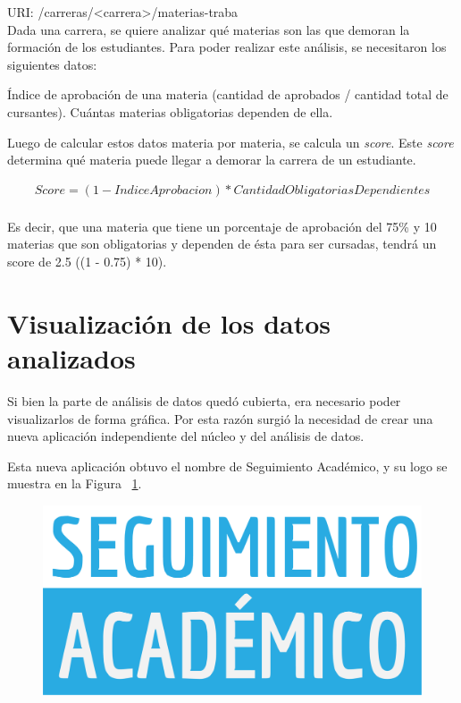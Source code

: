 URI: /carreras/<carrera>/materias-traba \\

Dada una carrera, se quiere analizar qué materias son las que demoran la formación de los estudiantes. 
Para poder realizar este análisis, se necesitaron los siguientes datos:
\begin{outline}
\1 Índice de aprobación de una materia (cantidad de aprobados / cantidad total de cursantes).
\1 Cuántas materias obligatorias dependen de ella.
\end{outline}

Luego de calcular estos datos materia por materia, se calcula un \textit{score}. Este \textit{score} determina qué materia puede llegar a demorar la carrera de un estudiante.

\begin{align*}
  Score = (1 - IndiceAprobacion) * CantidadObligatoriasDependientes\\
\end{align*}

Es decir, que una materia que tiene un porcentaje de aprobación del 75\% y 10 materias que son obligatorias y dependen de ésta para ser cursadas, tendrá un score de 2.5 ((1 - 0.75) * 10).



\section[Visualización de los datos analizados]{Visualización de los datos analizados}

Si bien la parte de análisis de datos quedó cubierta, era necesario poder visualizarlos de forma gráfica. Por esta razón surgió la necesidad de crear una nueva aplicación independiente del núcleo y del análisis de datos.

Esta nueva aplicación obtuvo el nombre de Seguimiento Académico, y su logo se muestra en la Figura ~\ref{fig:seguimiento-academico-logo}.

\begin{figure}[h!]
  \centering
    \includegraphics[scale=0.5]{images/seguimiento-academico/seguimiento-academico-blanco.png}
  \label{fig:seguimiento-academico-logo}
\end{figure}

